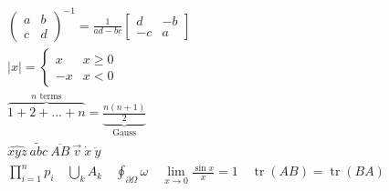 \documentclass{article}
\begin{document}
\begin{gather}
  \begin{pmatrix} a & b \\ c & d \end{pmatrix}^{-1}
  = \frac{1}{ad-bc}\begin{bmatrix} d & -b \\ -c & a \end{bmatrix} \\
  |x| = \begin{cases} x & x \ge 0 \\ -x & x < 0 \end{cases} \\
  \overbrace{1+2+\dots+n}^{n\text{ terms}} = \underbrace{\frac{n(n+1)}{2}}_{\text{Gauss}} \\
  \widehat{xyz}\ \widetilde{abc}\ \overline{AB}\ \vec{v}\ \dot{x}\ \ddot{y} \\
  \prod_{i=1}^{n} p_i \quad \bigcup_{k} A_k \quad \oint_{\partial\Omega}\omega
  \quad \lim_{x\to 0}\frac{\sin x}{x} = 1 \quad \operatorname{tr}(AB)=\operatorname{tr}(BA)
\end{gather}
\end{document}
